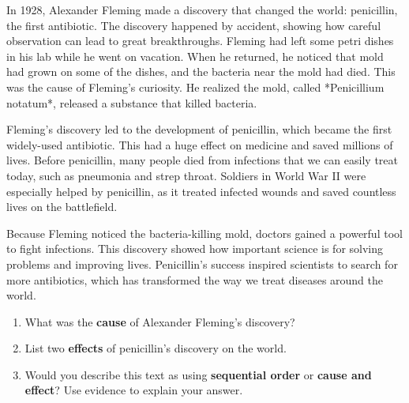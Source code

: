 \documentclass[12pt]{article}
\begin{document}
\begin{tcolorbox}[colframe=black!60, colback=white, 
coltitle=black, colbacktitle=black!15, fonttitle=\bfseries\Large, 
title=Text: The Discovery of Penicillin, halign title=center, left=10pt, right=10pt, top=10pt, bottom=15pt]
In 1928, Alexander Fleming made a discovery that changed the world: penicillin, the first antibiotic. The discovery happened by accident, showing how careful observation can lead to great breakthroughs. Fleming had left some petri dishes in his lab while he went on vacation. When he returned, he noticed that mold had grown on some of the dishes, and the bacteria near the mold had died. This was the cause of Fleming’s curiosity. He realized the mold, called *Penicillium notatum*, released a substance that killed bacteria.

Fleming’s discovery led to the development of penicillin, which became the first widely-used antibiotic. This had a huge effect on medicine and saved millions of lives. Before penicillin, many people died from infections that we can easily treat today, such as pneumonia and strep throat. Soldiers in World War II were especially helped by penicillin, as it treated infected wounds and saved countless lives on the battlefield.

Because Fleming noticed the bacteria-killing mold, doctors gained a powerful tool to fight infections. This discovery showed how important science is for solving problems and improving lives. Penicillin’s success inspired scientists to search for more antibiotics, which has transformed the way we treat diseases around the world.
\end{tcolorbox}

\begin{tcolorbox}[colframe=black!60, colback=white, 
coltitle=black, colbacktitle=black!15, fonttitle=\bfseries\Large, 
title=Independent Practice, halign title=center, left=10pt, right=10pt, top=10pt, bottom=15pt]
\begin{enumerate}[itemsep=4em]
    \item What was the \textbf{cause} of Alexander Fleming’s discovery?
    \item List two \textbf{effects} of penicillin’s discovery on the world.
    \item Would you describe this text as using \textbf{sequential order} or \textbf{cause and effect}? Use evidence to explain your answer.
\\[1em] \underline{\hspace{15cm}}
    \\[1em] \underline{\hspace{15cm}}
    \\[1em] \underline{\hspace{15cm}}
\end{enumerate}
\end{tcolorbox}
\end{document}
